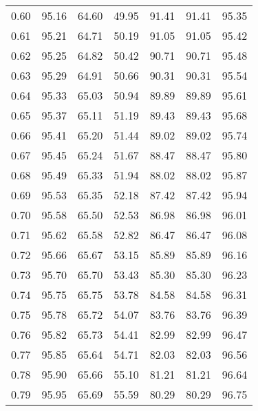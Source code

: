 \begin{tabular}{|c|c|c|c|c|c|c|}
      0.60 &     95.16 &     64.60 &      49.95 &   91.41 &      91.41 &         95.35 \\
      0.61 &     95.21 &     64.71 &      50.19 &   91.05 &      91.05 &         95.42 \\
      0.62 &     95.25 &     64.82 &      50.42 &   90.71 &      90.71 &         95.48 \\
      0.63 &     95.29 &     64.91 &      50.66 &   90.31 &      90.31 &         95.54 \\
      0.64 &     95.33 &     65.03 &      50.94 &   89.89 &      89.89 &         95.61 \\
      0.65 &     95.37 &     65.11 &      51.19 &   89.43 &      89.43 &         95.68 \\
      0.66 &     95.41 &     65.20 &      51.44 &   89.02 &      89.02 &         95.74 \\
      0.67 &     95.45 &     65.24 &      51.67 &   88.47 &      88.47 &         95.80 \\
      0.68 &     95.49 &     65.33 &      51.94 &   88.02 &      88.02 &         95.87 \\
      0.69 &     95.53 &     65.35 &      52.18 &   87.42 &      87.42 &         95.94 \\
      0.70 &     95.58 &     65.50 &      52.53 &   86.98 &      86.98 &         96.01 \\
      0.71 &     95.62 &     65.58 &      52.82 &   86.47 &      86.47 &         96.08 \\
      0.72 &     95.66 &     65.67 &      53.15 &   85.89 &      85.89 &         96.16 \\
      0.73 &     95.70 &     65.70 &      53.43 &   85.30 &      85.30 &         96.23 \\
      0.74 &     95.75 &     65.75 &      53.78 &   84.58 &      84.58 &         96.31 \\
      0.75 &     95.78 &     65.72 &      54.07 &   83.76 &      83.76 &         96.39 \\
      0.76 &     95.82 &     65.73 &      54.41 &   82.99 &      82.99 &         96.47 \\
      0.77 &     95.85 &     65.64 &      54.71 &   82.03 &      82.03 &         96.56 \\
      0.78 &     95.90 &     65.66 &      55.10 &   81.21 &      81.21 &         96.64 \\
      0.79 &     95.95 &     65.69 &      55.59 &   80.29 &      80.29 &         96.75 \\

\end{tabular}
